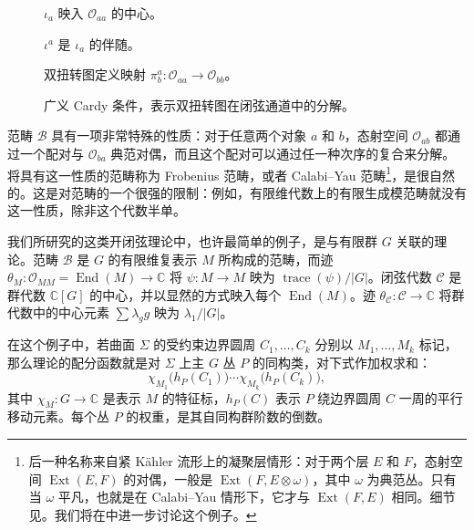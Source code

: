 \begin{figure}[H]
\centering
{}
\caption{$\iota_a$ 映入 $\mathcal{O}_{aa}$ 的中心。}\label{fig:2.9}
\end{figure}

\begin{figure}[H]
\centering
{}
\caption{$\iota^a$ 是 $\iota_a$ 的伴随。}\label{fig:2.10}
\end{figure}

\begin{figure}[H]
\centering
{}
\caption{双扭转图定义映射 $\pi_b^a\colon\mathcal{O}_{aa}\to\mathcal{O}_{bb}$。}\label{fig:2.11}
\end{figure}

\begin{figure}[H]
\centering
{}
\caption{广义 Cardy 条件，表示双扭转图在闭弦通道中的分解。}\label{fig:2.12}
\end{figure}

范畴 $\mathcal{B}$ 具有一项非常特殊的性质：对于任意两个对象 $a$ 和 $b$，态射空间 $\mathcal{O}_{ab}$ 都通过一个配对与 $\mathcal{O}_{ba}$ 典范对偶，而且这个配对可以通过任一种次序的复合来分解。将具有这一性质的范畴称为 Frobenius 范畴，或者 Calabi--Yau 范畴\footnote{后一种名称来自紧 Kähler 流形上的凝聚层情形：对于两个层 $E$ 和 $F$，态射空间 $\operatorname{Ext}(E,F)$ 的对偶，一般是 $\operatorname{Ext}(F,E\otimes\omega)$，其中 $\omega$ 为典范丛。只有当 $\omega$ 平凡，也就是在 Calabi--Yau 情形下，它才与 $\operatorname{Ext}(F,E)$ 相同。细节见。我们将在中进一步讨论这个例子。}，是很自然的。这是对范畴的一个很强的限制：例如，有限维代数上的有限生成模范畴就没有这一性质，除非这个代数半单。

\begin{example}\label{ex:2.2}
我们所研究的这类开闭弦理论中，也许最简单的例子，是与有限群 $G$ 关联的理论。范畴 $\mathcal{B}$ 是 $G$ 的有限维复表示 $M$ 所构成的范畴，而迹 $\theta_M\colon\mathcal{O}_{MM}=\operatorname{End}(M)\to\mathbb{C}$ 将 $\psi\colon M\to M$ 映为 $\operatorname{trace}(\psi)/|G|$。闭弦代数 $\mathcal{C}$ 是群代数 $\mathbb{C}[G]$ 的中心，并以显然的方式映入每个 $\operatorname{End}(M)$。迹 $\theta_{\mathcal{C}}\colon\mathcal{C}\to\mathbb{C}$ 将群代数中的中心元素 $\sum\lambda_g g$ 映为 $\lambda_1/|G|$。

在这个例子中，若曲面 $\Sigma$ 的受约束边界圆周 $C_1,\ldots,C_k$ 分别以 $M_1,\ldots,M_k$ 标记，那么理论的配分函数就是对 $\Sigma$ 上主 $G$ 丛 $P$ 的同构类，对下式作加权求和：
\[
\chi_{M_1}\bigl(h_P(C_1)\bigr)\cdots\chi_{M_k}\bigl(h_P(C_k)\bigr),
\]
其中 $\chi_M\colon G\to\mathbb{C}$ 是表示 $M$ 的特征标，$h_P(C)$ 表示 $P$ 绕边界圆周 $C$ 一周的平行移动元素。每个丛 $P$ 的权重，是其自同构群阶数的倒数。
\end{example}

